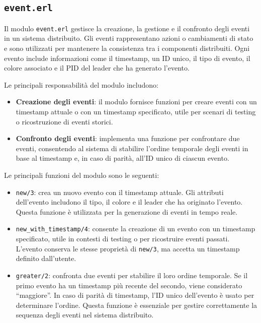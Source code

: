 \documentclass[12pt, a4paper]{report}
\begin{document}
\subsection{\texttt{event.erl}}

Il modulo \texttt{event.erl} gestisce la creazione, la gestione e il confronto degli eventi in un sistema distribuito. Gli eventi rappresentano azioni o cambiamenti di stato e sono utilizzati per mantenere la consistenza tra i componenti distribuiti. Ogni evento include informazioni come il timestamp, un ID unico, il tipo di evento, il colore associato e il PID del leader che ha generato l'evento.

Le principali responsabilità del modulo includono:

\begin{itemize}
    \item \textbf{Creazione degli eventi}: il modulo fornisce funzioni per creare eventi con un timestamp attuale o con un timestamp specificato, utile per scenari di testing o ricostruzione di eventi storici.

    \item \textbf{Confronto degli eventi}: implementa una funzione per confrontare due eventi, consentendo al sistema di stabilire l'ordine temporale degli eventi in base al timestamp e, in caso di parità, all'ID unico di ciascun evento.

\end{itemize}

\noindent
Le principali funzioni del modulo sono le seguenti:

\begin{itemize}
    \item \texttt{new/3}: crea un nuovo evento con il timestamp attuale. Gli attributi dell'evento includono il tipo, il colore e il leader che ha originato l'evento. Questa funzione \`e utilizzata per la generazione di eventi in tempo reale.

    \item \texttt{new\_with\_timestamp/4}: consente la creazione di un evento con un timestamp specificato, utile in contesti di testing o per ricostruire eventi passati. L'evento conserva le stesse proprietà di \texttt{new/3}, ma accetta un timestamp definito dall'utente.

    \item \texttt{greater/2}: confronta due eventi per stabilire il loro ordine temporale. Se il primo evento ha un timestamp più recente del secondo, viene considerato ``maggiore''. In caso di parità di timestamp, l'ID unico dell'evento \`e usato per determinare l'ordine. Questa funzione \`e essenziale per gestire correttamente la sequenza degli eventi nel sistema distribuito.

\end{itemize}
\end{document}
